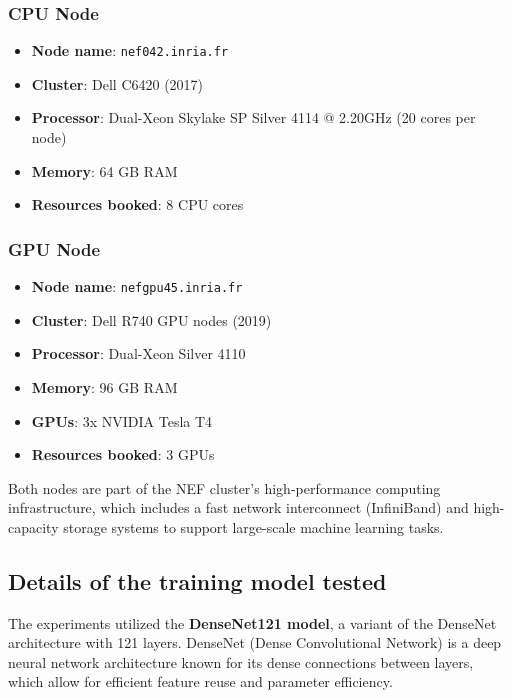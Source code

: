 \documentclass{article}
\begin{document}
\subsubsection{CPU Node}
\begin{itemize}
    \item \textbf{Node name}: \texttt{nef042.inria.fr}
    \item \textbf{Cluster}: Dell C6420 (2017)
    \item \textbf{Processor}: Dual-Xeon Skylake SP Silver 4114 @ 2.20GHz (20 cores per node)
    \item \textbf{Memory}: 64 GB RAM
    \item \textbf{Resources booked}: 8 CPU cores
\end{itemize}

\subsubsection{GPU Node}
\begin{itemize}
    \item \textbf{Node name}: \texttt{nefgpu45.inria.fr}
    \item \textbf{Cluster}: Dell R740 GPU nodes (2019)
    \item \textbf{Processor}: Dual-Xeon Silver 4110
    \item \textbf{Memory}: 96 GB RAM
    \item \textbf{GPUs}: 3x NVIDIA Tesla T4
    \item \textbf{Resources booked}: 3 GPUs
\end{itemize}

Both nodes are part of the NEF cluster's high-performance computing infrastructure, which includes a fast network interconnect (InfiniBand) and high-capacity storage systems to support large-scale machine learning tasks.

\subsection{Details of the training model tested}
The experiments utilized the \textbf{DenseNet121 model}, a variant of the DenseNet architecture with 121 layers. DenseNet (Dense Convolutional Network) is a deep neural network architecture known for its dense connections between layers, which allow for efficient feature reuse and parameter efficiency.
\end{document}
